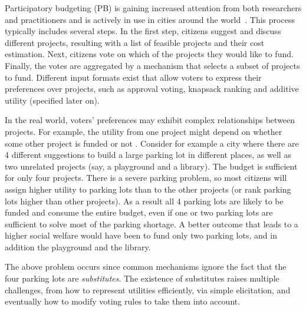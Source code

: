 \documentclass[runningheads]{llncs}
\begin{document}
Participatory budgeting (PB) is gaining increased attention from both researchers and practitioners  and is actively in use in  cities around the world~\cite{su2017porto}. 
This process typically includes several steps. In the first step,  citizens suggest and discuss  different projects, resulting with a   list of feasible projects and  their cost estimation. Next,  citizens vote on which of the projects they would like to  fund. Finally, the votes are aggregated by a mechanism that selects a subset of projects to fund.
Different  input formats exist that allow  voters to express their preferences over    projects, such as approval voting, knapsack ranking and additive utility (specified later on). %


In the real world, voters' preferences may exhibit complex relationships between projects. For example,  the utility from one project might depend on whether some other project is funded or not \cite{jain2020participatory, jain2021partition}.
Consider for example a city where there are 4 different suggestions to build a large parking lot in different places, as well as two unrelated projects (say, a playground and a library). The budget is sufficient for only four projects.
There is a severe parking problem, so most citizens will assign higher utility to parking lots than to the other projects (or rank parking lots higher than other projects). As a result all 4 parking lots are likely to be funded and consume the entire budget, even if one or two parking lots are sufficient to solve most of the parking shortage.
A better outcome that leads to a higher social welfare would have been to fund only two parking lots, and in addition the playground and the library. 

The above problem occurs since common mechanisms   ignore the fact that the four parking lots are \emph{substitutes}.   The existence of substitutes raises multiple challenges, from how to represent utilities efficiently, via simple elicitation, and eventually how to modify voting rules to take them into account.
\end{document}
